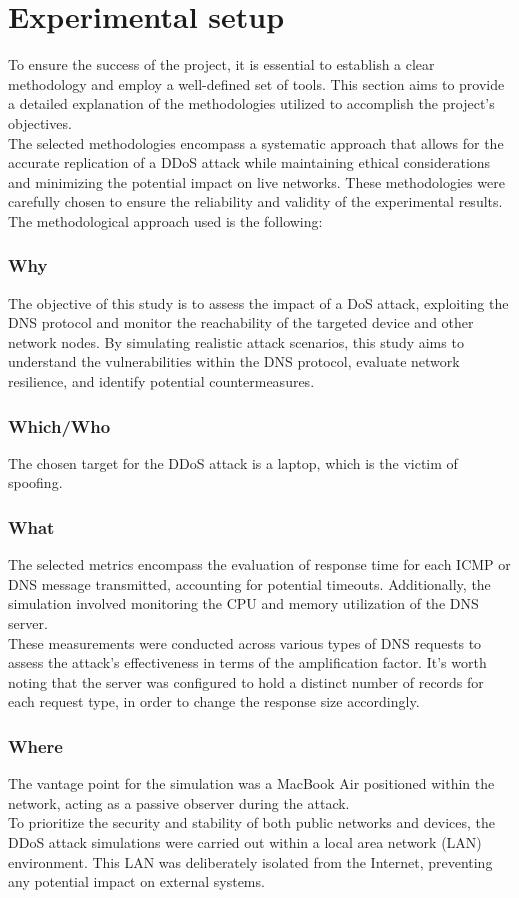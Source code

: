 \section{Experimental setup}

To ensure the success of the project, it is essential to establish a clear methodology and employ a well-defined set of tools.
This section aims to provide a detailed explanation of the methodologies utilized to accomplish the project's objectives.\\
The selected methodologies encompass a systematic approach that allows for the accurate replication of a
DDoS attack while maintaining ethical considerations and minimizing the potential impact on live networks.
These methodologies were carefully chosen to ensure the reliability and validity of the experimental results.
The methodological approach used is the following:

\subsubsection*{Why}
The objective of this study is to assess the impact of a DoS attack, exploiting the DNS protocol and monitor the reachability
of the targeted device and other network nodes.
By simulating realistic attack scenarios, this study aims to understand the vulnerabilities within the DNS protocol, evaluate network resilience,
and identify potential countermeasures.

\subsubsection*{Which/Who}
The chosen target for the DDoS attack is a laptop, which is the victim of spoofing.

\subsubsection*{What}
The selected metrics encompass the evaluation of response time for each ICMP or DNS message transmitted, accounting for potential timeouts.
Additionally, the simulation involved monitoring the CPU and memory utilization of the DNS server.\\
These measurements were conducted across various types of DNS requests to assess the attack's effectiveness in terms of the amplification factor.
It's worth noting that the server was configured to hold a distinct number of records for each request type, in order to change the response size accordingly.

\subsubsection*{Where}
The vantage point for the simulation was a MacBook Air positioned within the network,
acting as a passive observer during the attack.\\
To prioritize the security and stability of both public networks and devices,
the DDoS attack simulations were carried out within a local area network (LAN) environment.
This LAN was deliberately isolated from the Internet, preventing any potential impact on external systems.\\
